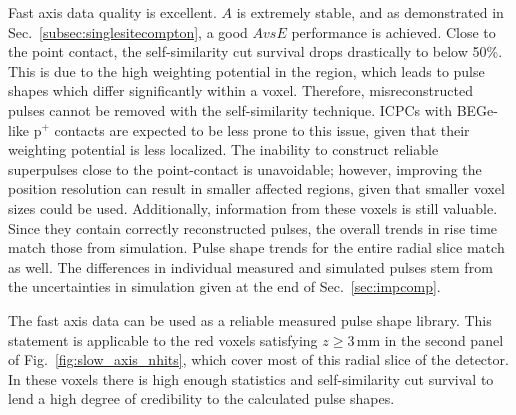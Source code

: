 Fast axis data quality is excellent. $A$ is extremely stable, and as demonstrated in Sec.~\ref{subsec:singlesitecompton}, a good $AvsE$ performance is achieved. Close to the point contact, the self-similarity cut survival drops drastically to below 50\%. This is due to the high weighting potential in the region, which leads to pulse shapes which differ significantly within a voxel. Therefore, misreconstructed pulses cannot be removed with the self-similarity technique. ICPCs with BEGe-like p$^+$ contacts are expected to be less prone to this issue, given that their weighting potential is less localized. The inability to construct reliable superpulses close to the point-contact is unavoidable; however, improving the position resolution can result in smaller affected regions, given that smaller voxel sizes could be used. Additionally, information from these voxels is still valuable. Since they contain correctly reconstructed pulses, the overall trends in rise time match those from simulation. Pulse shape trends for the entire radial slice match as well. The differences in individual measured and simulated pulses stem from the uncertainties in simulation given at the end of Sec.~\ref{sec:impcomp}.

The fast axis data can be used as a reliable measured pulse shape library. This statement is applicable to the red voxels satisfying $z \ge 3$\,mm in the second panel of Fig.~\ref{fig:slow_axis_nhits}, which cover most of this radial slice of the detector. In these voxels there is high enough statistics and self-similarity cut survival to lend a high degree of credibility to the calculated pulse shapes.